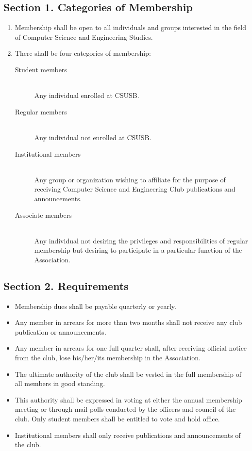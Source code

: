 \documentclass{article}
\begin{document}
  \subsection{Section 1. Categories of Membership}
    \begin{enumerate}
      \item Membership shall be open to all individuals and groups interested in the field of Computer Science and Engineering Studies.
      \item There shall be four categories of membership:
      \begin{description}
        \item[Student members] ~\\
          Any individual enrolled at CSUSB.
        \item[Regular members] ~\\
          Any individual not enrolled at CSUSB.
        \item[Institutional members] ~\\
          Any group or organization wishing to affiliate for the purpose of receiving Computer Science and Engineering Club publications and announcements.
        \item[Associate members] ~\\
          Any individual not desiring the privileges and responsibilities of regular membership but desiring to participate in a particular function of the Association.
      \end{description}
    \end{enumerate}

  \subsection{Section 2. Requirements}
    \begin{itemize}
      \item Membership dues shall be payable quarterly or yearly.
      \item Any member in arrears for more than two months shall not receive any club publication or announcements.
      \item Any member in arrears for one full quarter shall, after receiving official notice from the club, lose his/her/its membership in the Association.
      \item The ultimate authority of the club shall be vested in the full membership of all members in good standing.
      \item This authority shall be expressed in voting at either the annual membership meeting or through mail polls conducted by the officers and council of the club. Only student members shall be entitled to vote and hold office.
      \item Institutional members shall only receive publications and announcements of the club.
    \end{itemize}
\end{document}
